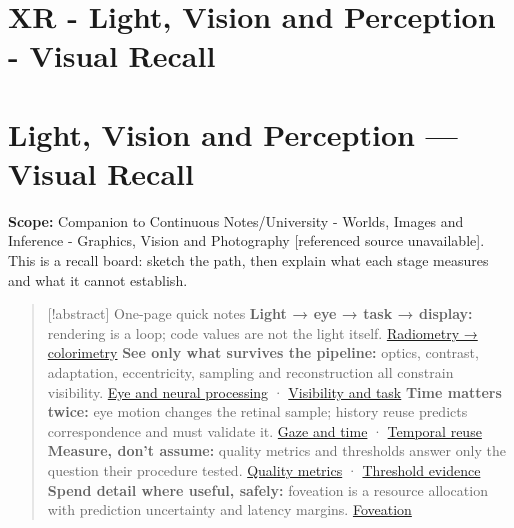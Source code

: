 \hypertarget{appendix-73c6b8ed5a87}{}
\section*{XR - Light, Vision and Perception - Visual Recall}
\section{Light, Vision and Perception --- Visual Recall}\label{appendix-73c6b8ed5a87-light-vision-and-perception-visual-recall}

\textbf{Scope:} Companion to {Continuous Notes/University - Worlds, Images and Inference - Graphics, Vision and Photography {[}referenced source unavailable{]}}. This is a recall board: sketch the path, then explain what each stage measures and what it cannot establish.

\begin{quote}
{[}!abstract{]} One-page quick notes \textbf{Light → eye → task → display:} rendering is a loop; code values are not the light itself. \hyperref[04-visual-computing-ii-ch042-light-must-become-a-quantity-before-it-becomes-a-color]{Radiometry → colorimetry} \textbf{See only what survives the pipeline:} optics, contrast, adaptation, eccentricity, sampling and reconstruction all constrain visibility. \hyperref[04-visual-computing-ii-ch042-the-eye-is-an-optical-instrument-with-neural-processing-inside-it]{Eye and neural processing} · \hyperref[04-visual-computing-ii-ch042-visibility-is-about-contrast-conditions-and-tasks]{Visibility and task} \textbf{Time matters twice:} eye motion changes the retinal sample; history reuse predicts correspondence and must validate it. \hyperref[04-visual-computing-ii-ch042-a-gaze-sample-needs-a-time-as-well-as-a-direction]{Gaze and time} · \hyperref[04-visual-computing-ii-ch042-temporal-reconstruction-is-an-inference-about-correspondence]{Temporal reuse} \textbf{Measure, don't assume:} quality metrics and thresholds answer only the question their procedure tested. \hyperref[04-visual-computing-ii-ch042-quality-numbers-need-a-question-they-can-actually-answer]{Quality metrics} · \hyperref[04-visual-computing-ii-ch042-a-threshold-is-evidence-from-a-procedure-not-a-universal-border]{Threshold evidence} \textbf{Spend detail where useful, safely:} foveation is a resource allocation with prediction uncertainty and latency margins. \hyperref[04-visual-computing-ii-ch042-foveation-is-allocation-under-uncertain-perception-and-timing]{Foveation}
\end{quote}


